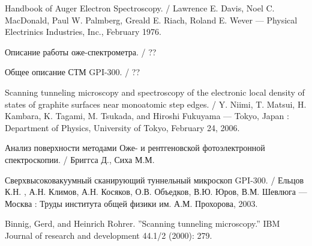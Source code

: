 \documentclass[a4paper, 12pt]{article}
\begin{document}
\begin{thebibliography}{2}
	
	 Handbook of Auger Electron Spectroscopy. /  Lawrence E. Davis, Noel C. MacDonald, Paul W. Palmberg, Greald E. Riach, Roland E. Wever --- Physical Electrinics Industries, Inc., February 1976.
	
	 Описание работы оже-спектрометра. / ??
	
	 Общее описание СТМ GPI-300. / ??
	
	 Scanning tunneling microscopy and spectroscopy of the electronic local density of states of graphite surfaces near monoatomic step edges. / Y. Niimi, T. Matsui, H. Kambara, K. Tagami, M. Tsukada, and Hiroshi Fukuyama --- Tokyo, Japan : Department of Physics, University of Tokyo, February 24, 2006.
	
	 Анализ поверхности методами Оже- и рентгеновской фотоэлектронной спектроскопии. / Бриггса Д., Сиха М.М.
	
	 Сверхвысоковакуумный сканирующий туннельный микроскоп GPI-300. / Ельцов К.Н. , А.Н. Климов, А.Н. Косяков, О.В. Объедков, В.Ю. Юров, В.М. Шевлюга --- Москва : Труды института общей физики им. А.М. Прохорова, 2003.
	
	 Binnig, Gerd, and Heinrich Rohrer. ''Scanning tunneling microscopy.'' IBM Journal of research and development 44.1/2 (2000): 279.
	
\end{thebibliography}


\newpage
















	
	
	
	
	
	
	
	
	
	
	
	
	
	
	
	
	
	
	
	
	
	
	
\end{document}
